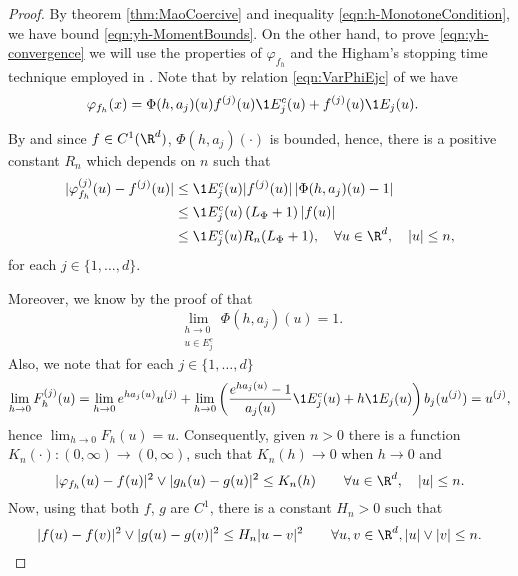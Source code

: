 \begin{proof}
	By theorem \ref{thm:MaoCoercive} and inequality \eqref{eqn:h-MonotoneCondition}, 
	we have	 bound \eqref{eqn:yh-MomentBounds}.
	On the other hand, to prove \eqref{eqn:yh-convergence} we will use the properties of 
	$\varphi_{f_h}$ and the Higham's stopping time technique employed in \cite[Thm 2.2]{Higham2002b}. 
	Note that by relation \eqref{eqn:VarPhiEjc} of  we have 
	\begin{align*}
		\varphi_{f_h}(x) 
			&= \Phi(h,a_j)(u) f^{(j)}(u) \1{E_j^c}(u) 
				+ f^{(j)}(u) \1{E_j}(u).
	\end{align*}
	
	By   and since $f \in C^1(\R^d)$,   $\Phi(h,a_j)(\cdot)$ is bounded,
	hence, there is a positive constant $R_n$ which depends on $n$ such that 
	\begin{align*}	
		|\varphi_{f_h}^{(j)}(u) - f^{(j)}(u)|
		&\leq
			\1{E_j^c}(u)
			|f^{(j)}(u)|
			\left|
				\Phi(h,a_j)(u) - 1
			\right| \notag \\
		&\leq
			\1{E_j^c}(u)
			\left(
				L_{\Phi} + 1
			\right)
			|f(u)|	 \notag \\
		&\leq
		\1{E_j^c}(u) R_n(L_{\Phi}+1), \quad \forall u \in \R^d, \quad |u|\leq n,
	\end{align*}
	for each $j\in \{1,\dots, d\}$.
	
	
	Moreover, we know by the proof of  that
	\begin{equation*}
	 \lim_{
	 	\substack{
		 	h\to 0 \\
		 	u\in E_j^c	
	 	}
	 }
	 \Phi(h,a_j)(u) = 1.	 	
	\end{equation*}
	Also, we note that for each $j \in \{1, \dots , d\}$
	\begin{equation*}
	\lim_{h \to 0} F_h^{(j)}(u)
		=
		\lim_{h \to 0}
			e^{ha_j(u)} u^{(j)} + 
		\lim_{h \to 0}
			\left(
				\frac{e^{ha_j(u)}-1}{a_j(u)}
				\1{E_j^c}(u)
				+h \1{E_j}(u)
			\right)
			b_j(u^{(j)}) 
		= u^{(j)},
	\end{equation*}
	hence
	$%
		\displaystyle
		\lim_{h\to 0} F_h(u)=u.
	$ %
	Consequently, given $n>0$ there is  a function $K_n(\cdot):(0,\infty)\to (0,\infty)$, such that
	$K_n(h)\to 0$ when $h \to 0$ and
	\begin{equation}\label{eqn:PhihGhKRhBound}
		|\varphi_{f_h}(u)-f(u)|^2 \vee |g_h(u)-g(u)|^2
		\leq K_n(h) \qquad \forall u\in \R^d, \quad |u| \leq n.
	\end{equation}
	Now, using that both $f$, $g$ are $C^{1}$, there is  a constant $H_n>0$ such that
	\begin{equation}\label{eqn:f-gHRBound}
		|f(u)-f(v)|^2 \vee |g(u)-g(v)|^2
		\leq H_n |u-v|^2\qquad \forall u,v \in \R^d, |u|\vee |v| \leq n.
	\end{equation}
	

\end{proof}

